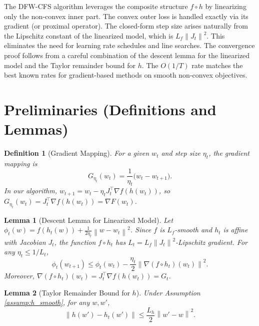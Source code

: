 \documentclass{article}
\newcommand{\norm}[1]{\left\| #1 \right\|}
\newtheorem{lemma}{Lemma}
\newtheorem{definition}{Definition}
\begin{document}
The DFW-CFS algorithm leverages the composite structure $f \circ h$ by linearizing only the non-convex inner part. The convex outer loss is handled exactly via its gradient (or proximal operator). The closed-form step size arises naturally from the Lipschitz constant of the linearized model, which is $L_f \norm{J_t}^2$. This eliminates the need for learning rate schedules and line searches. The convergence proof follows from a careful combination of the descent lemma for the linearized model and the Taylor remainder bound for $h$. The $O(1/T)$ rate matches the best known rates for gradient-based methods on smooth non-convex objectives.

\section*{Preliminaries (Definitions and Lemmas)}

\begin{definition}[Gradient Mapping]
For a given $w_t$ and step size $\eta_t$, the gradient mapping is
\begin{equation}
    G_{\eta_t}(w_t) = \frac{1}{\eta_t}\bigl(w_t - w_{t+1}\bigr).
\end{equation}
In our algorithm, $w_{t+1} = w_t - \eta_t J_t^\top \nabla f(h(w_t))$, so $G_{\eta_t}(w_t) = J_t^\top \nabla f(h(w_t)) = \nabla F(w_t)$.
\end{definition}

\begin{lemma}[Descent Lemma for Linearized Model] \label{lem:descent_model}
Let $\phi_t(w) = f(h_t(w)) + \frac{1}{2\eta_t}\norm{w - w_t}^2$. Since $f$ is $L_f$-smooth and $h_t$ is affine with Jacobian $J_t$, the function $f \circ h_t$ has $L_t = L_f \norm{J_t}^2$-Lipschitz gradient. For any $\eta_t \le 1/L_t$,
\begin{equation}
    \phi_t(w_{t+1}) \le \phi_t(w_t) - \frac{\eta_t}{2} \norm{\nabla (f \circ h_t)(w_t)}^2.
\end{equation}
Moreover, $\nabla (f \circ h_t)(w_t) = J_t^\top \nabla f(h(w_t)) = G_t$.
\end{lemma}

\begin{lemma}[Taylor Remainder Bound for $h$] \label{lem:taylor_h}
Under Assumption \ref{assump:h_smooth}, for any $w, w'$,
\begin{equation}
    \norm{h(w') - h_t(w')} \le \frac{L_h}{2} \norm{w' - w}^2.
\end{equation}
\end{lemma}
\end{document}
